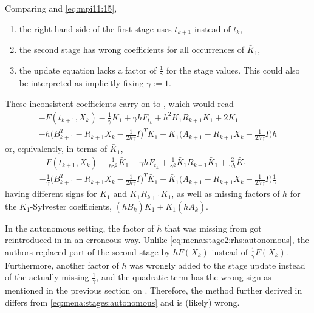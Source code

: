 Comparing \cite[Equation (15)]{MPIMD11-06} and \eqref{eq:mpi11:15},
\begin{enumerate}
  \item
    the right-hand side of the first stage uses $t_{k+1}$ instead of $t_k$,
  \item
    the second stage has wrong coefficients for all occurrences of $\bar{K}_1$,
  \item
    the update equation lacks a factor of $\frac{1}{\gamma}$ for the stage values.
    This could also be interpreted as implicitly fixing $\gamma := 1$.
    \label{item:implicit gamma=1}
\end{enumerate}
These inconsistent coefficients carry on to \cite[Equation (16)]{MPIMD11-06},
which would read
\begin{multline}
  -F(t_{k+1}, X_k) - \tfrac{1}{\gamma} K_1 + \gamma h F_{t_k} + h^2 K_1 R_{k+1} K_1 + 2K_1 \\
  -h \big( B^T_{k+1} - R_{k+1}X_k - \tfrac{1}{2h\gamma}I \big)^T K_1
  -K_1 \big( A_{k+1} - R_{k+1}X_k - \tfrac{1}{2h\gamma}I \big) h
\end{multline}
or, equivalently, in terms of $\bar{K}_1$,
\begin{multline}
  -F(t_{k+1}, X_k) - \tfrac{1}{h\gamma^2} \bar{K}_1 + \gamma h F_{t_k} + \tfrac{1}{\gamma^2} \bar{K}_1 R_{k+1} \bar{K}_1 + \tfrac{2}{\gamma h}\bar{K}_1 \\
  -\tfrac{1}{\gamma} \big( B^T_{k+1} - R_{k+1}X_k - \tfrac{1}{2h\gamma}I \big)^T \bar{K}_1
  -\bar{K}_1 \big( A_{k+1} - R_{k+1}X_k - \tfrac{1}{2h\gamma}I \big) \tfrac{1}{\gamma}
\end{multline}
having different signs for $K_1$ and $K_1R_{k+1}K_1$,
as well as missing factors of $h$ for the $K_1$-Sylvester coefficients, $(h\bar{B}_k) K_1 + K_1 (h\bar{A}_k)$.

In the autonomous setting,
the factor of $h$ that was missing from \cite[Equation~(16)]{MPIMD11-06}
got reintroduced in \cite[Equation~(17)]{MPIMD11-06} in an erroneous way.
Unlike \eqref{eq:mena:stage2:rhs:autonomous},
the authors replaced part of the second stage by $h F(X_k)$ instead of $\frac{1}{\gamma} F(X_k)$.
Furthermore, another factor of $h$ was wrongly added to the stage update \cite[Equations (18) and (21)]{MPIMD11-06}
instead of the actually missing $\frac{1}{\gamma}$,
and the quadratic term has the wrong sign as mentioned in the previous section on \cite{Mena2007}.
Therefore, the method further derived in \cite[Equations (21) to (24)]{MPIMD11-06} differs from \eqref{eq:mena:stages:autonomous}
and is (likely) wrong.

